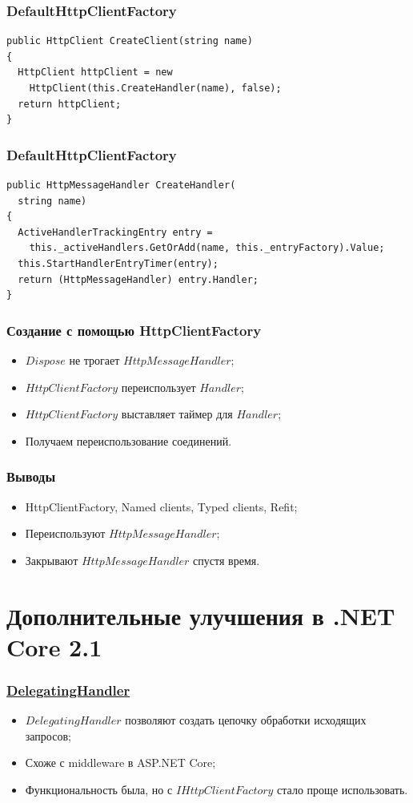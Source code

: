 \documentclass[17pt,aspectratio=169]{beamer}
\begin{document}
\begin{frame}[fragile]
\frametitle{DefaultHttpClientFactory}
\begin{lstlisting}
public HttpClient CreateClient(string name)
{
  HttpClient httpClient = new 
    HttpClient(this.CreateHandler(name), false);
  return httpClient;
}
\end{lstlisting}
\end{frame}

\begin{frame}[fragile]
\frametitle{DefaultHttpClientFactory}
\begin{lstlisting}
public HttpMessageHandler CreateHandler(
  string name)
{
  ActiveHandlerTrackingEntry entry = 
    this._activeHandlers.GetOrAdd(name, this._entryFactory).Value;
  this.StartHandlerEntryTimer(entry);
  return (HttpMessageHandler) entry.Handler;
}
\end{lstlisting}
\end{frame}

\begin{frame}
\frametitle{Создание с помощью HttpClientFactory}
\begin{itemize}
	\item <1-> $Dispose$ не трогает $HttpMessageHandler$;
	\item <2-> $HttpClientFactory$ переиспользует $Handler$;
	\item <3-> $HttpClientFactory$ выставляет таймер для $Handler$;
	\item <4-> Получаем переиспользование соединений.
\end{itemize}
\end{frame}

\begin{frame}
\frametitle{Выводы}
\begin{itemize}
	\item <1-> HttpClientFactory, Named clients, Typed clients, Refit;
	\item <2-> Переиспользуют $HttpMessageHandler$;
	\item <3-> Закрывают $HttpMessageHandler$ спустя время.
\end{itemize}
\end{frame}

\section{Дополнительные улучшения в .NET Core 2.1}
\begin{frame}
\frametitle{\href{https://docs.microsoft.com/en-us/dotnet/api/system.net.http.delegatinghandler?view=netcore-2.2}{DelegatingHandler}}
\begin{itemize}
	\item <1-> $DelegatingHandler$ позволяют создать цепочку обработки исходящих запросов;
	\item <2-> Схоже с middleware в ASP.NET Core;
	\item <3-> Функциональность была, но с $IHttpClientFactory$ стало проще использовать.
\end{itemize}
\end{frame}
\end{document}
